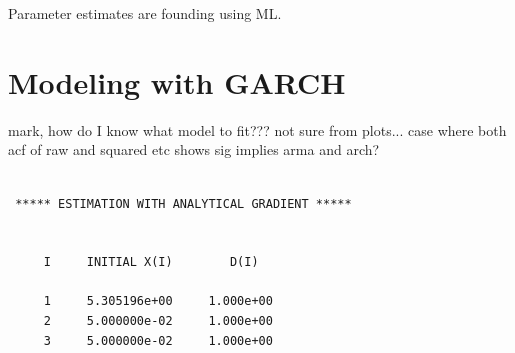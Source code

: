 \documentclass[11pt]{article}\usepackage[]{graphicx}\usepackage[]{color}
\makeatletter
\newenvironment{kframe}{%
 \def\at@end@of@kframe{}%
 \ifinner\ifhmode%
  \def\at@end@of@kframe{\end{minipage}}%
  \begin{minipage}{\columnwidth}%
 \fi\fi%
 \def\FrameCommand##1{\hskip\@totalleftmargin \hskip-\fboxsep
 \colorbox{shadecolor}{##1}\hskip-\fboxsep
     \hskip-\linewidth \hskip-\@totalleftmargin \hskip\columnwidth}%
 \MakeFramed {\advance\hsize-\width
   \@totalleftmargin\z@ \linewidth\hsize
   \@setminipage}}%
 {\par\unskip\endMakeFramed%
 \at@end@of@kframe}
\newenvironment{knitrout}{}{} %
\makeatother
\begin{document}
Parameter estimates are founding using ML.

\section*{Modeling with GARCH}

mark, how do I know what model to fit??? not sure from plots...
case where both acf of raw and squared etc shows sig implies arma and arch?
\begin{knitrout}\footnotesize
{}\color{fgcolor}\begin{kframe}


{\ttfamily\noindent\bfseries{}}

{\ttfamily\noindent\bfseries\color{errorcolor}{Error in summary(g121): object 'g121' not found}}

{\ttfamily\noindent\bfseries\color{errorcolor}{Error in AIC(g121): object 'g121' not found}}\begin{verbatim}

 ***** ESTIMATION WITH ANALYTICAL GRADIENT ***** 


     I     INITIAL X(I)        D(I)

     1     5.305196e+00     1.000e+00
     2     5.000000e-02     1.000e+00
     3     5.000000e-02     1.000e+00


\end{verbatim}
\end{kframe}
\end{knitrout}
\end{document}
